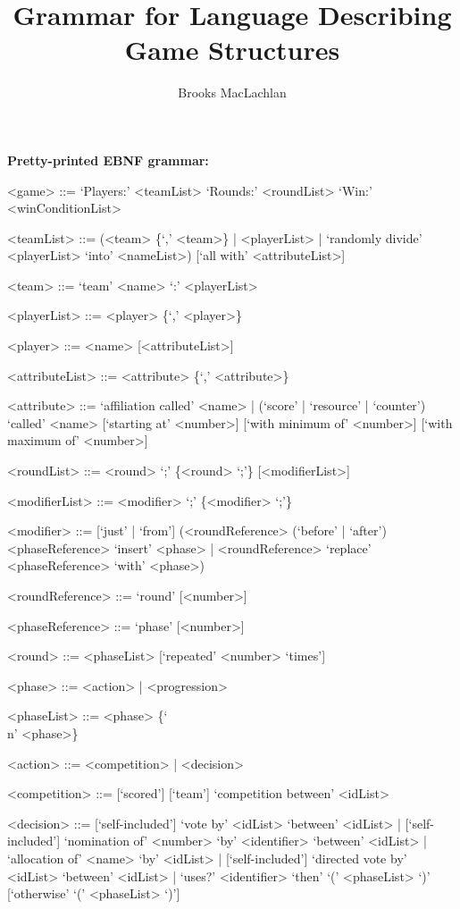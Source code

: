 \documentclass{article}
\title{Grammar for Language Describing Game Structures}
\author{Brooks MacLachlan}
\begin{document}
\maketitle

\noindent \textbf{Pretty-printed EBNF grammar:}
\begin{grammar}
<game> ::= `Players:' <teamList> `Rounds:' <roundList> `Win:' 
<winConditionList>

<teamList> ::= (<team> \{`,' <team>\} | <playerList> | `randomly divide' 
<playerList> `into' <nameList>) [`all with' <attributeList>]

<team> ::= `team' <name> `:' <playerList>

<playerList> ::= <player> \{`,' <player>\}

<player> ::= <name> [<attributeList>]

<attributeList> ::= <attribute> \{`,' <attribute>\}

<attribute> ::= `affiliation called' <name> | (`score' | `resource' | 
`counter') `called'
<name> [`starting at' <number>] [`with minimum of' <number>] [`with maximum of' 
<number>]

<roundList> ::= <round> `;' \{<round> `;'\} [<modifierList>]

<modifierList> ::= <modifier> `;' \{<modifier> `;'\}

<modifier> ::= [`just' | `from'] (<roundReference> (`before' | `after') 
<phaseReference> `insert' <phase> | <roundReference> `replace' <phaseReference> 
`with' <phase>)

<roundReference> ::= `round' [<number>]

<phaseReference> ::= `phase' [<number>]

<round> ::= <phaseList> [`repeated' <number> `times']

<phase> ::= <action> | <progression>

<phaseList> ::= <phase> \{`\\n' <phase>\}

<action> ::= <competition> | <decision>

<competition> ::= [`scored'] [`team'] `competition between' <idList>

<decision> ::= [`self-included'] `vote by' <idList> `between' <idList> | 
[`self-included'] `nomination of' <number> `by' <identifier> `between' <idList> 
| `allocation of' <name> `by' <idList> | [`self-included'] `directed vote by' 
<idList> `between' 
<idList> | `uses?' <identifier> `then' `(' <phaseList> `)' [`otherwise' `(' 
<phaseList> `)']


\end{grammar}
\end{document}
